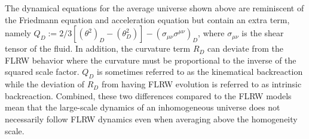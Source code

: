 \documentclass[a4paper,11pt]{article}
\begin{document}
	The dynamical equations for the average universe shown above are reminiscent of the Friedmann equation and acceleration equation but contain an extra term, namely $Q_D:=2/3\left[  (\theta^2)_D - (\theta_D ^2)\right]  - \left( \sigma_{\mu\nu}\sigma^{\mu\nu}\right) _D$, where $\sigma_{\mu\nu}$ is the shear tensor of the fluid. In addition, the curvature term $R_D$ can deviate from the FLRW behavior where the curvature must be proportional to the inverse of the squared scale factor. $Q_D$ is sometimes referred to as the kinematical backreaction while the deviation of $R_D$ from having FLRW evolution is referred to as intrinsic backreaction. Combined, these two differences compared to the FLRW models mean that the large-scale dynamics of an inhomogeneous universe does not necessarily follow FLRW dynamics even when averaging above the homogeneity scale.
\end{document}
